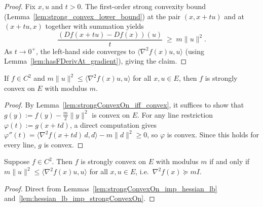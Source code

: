 \begin{proof}
  \leanok{}
  Fix $x, u$ and $t > 0$. The first-order strong convexity bound
  (Lemma~\ref{lem:strong_convex_lower_bound}) at the pair $(x, x + tu)$ and at
  $(x+tu, x)$ together with summation yields
  \[
    \frac{(Df(x+tu) - Df(x))(u)}{t} \;\ge\; m\|u\|^2.
  \]
  As $t \to 0^+$, the left-hand side converges to $\langle \nabla^2 f(x)u, u\rangle$
  (using Lemma~\ref{lem:hasFDerivAt_gradient}), giving the claim.
\end{proof}

\begin{lemma}\label{lem:hessian_lb_imp_strongConvexOn}
  \leanok{}
  If $f \in C^2$ and $m\|u\|^2 \le \langle \nabla^2 f(x) u, u\rangle$ for all
  $x, u \in E$, then $f$ is strongly convex on $E$ with modulus $m$.
\end{lemma}

\begin{proof}
  \leanok{}
  By Lemma~\ref{lem:strongConvexOn_iff_convex}, it suffices to show that
  $g(y) := f(y) - \frac{m}{2}\|y\|^2$ is convex on $E$. For any line restriction
  $\varphi(t) := g(x + t d)$, a direct computation gives
  $\varphi''(t) = \langle \nabla^2 f(x+td)\, d, d\rangle - m\|d\|^2 \ge 0$,
  so $\varphi$ is convex. Since this holds for every line, $g$ is convex.
\end{proof}

\begin{lemma}\label{lem:hessian_char_strong_convex}
  \leanok{}
  Suppose $f \in C^2$. Then $f$ is strongly convex on $E$ with modulus $m$ if and only if
  $m\|u\|^2 \le \langle \nabla^2 f(x) u, u\rangle$ for all $x, u \in E$, i.e.\ $\nabla^2 f(x) \succeq mI$.
\end{lemma}

\begin{proof}
  \leanok{}
  Direct from Lemmas~\ref{lem:strongConvexOn_imp_hessian_lb} and~\ref{lem:hessian_lb_imp_strongConvexOn}.
\end{proof}


